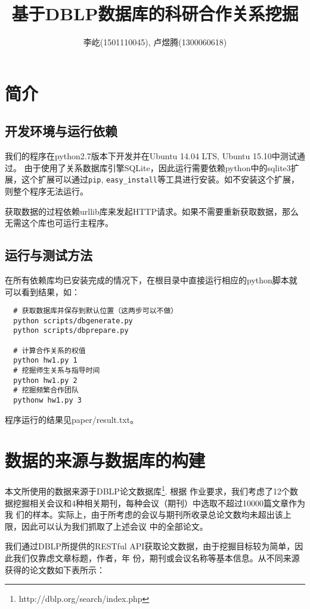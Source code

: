 \documentclass[a4paper]{article}
\title{基于DBLP数据库的科研合作关系挖掘}
\author{李屹(1501110045), 卢煜腾(1300060618)}
\begin{document}
\maketitle

\section{简介} 
\subsection{开发环境与运行依赖}
我们的程序在python2.7版本下开发并在Ubuntu 14.04 LTS, Ubuntu 15.10中测试通过。
由于使用了关系数据库引擎SQLite，因此运行需要依赖python中的sqlite3扩展，这个扩展可以通过\texttt{pip},
\texttt{easy\_install}等工具进行安装。如不安装这个扩展，则整个程序无法运行。

获取数据的过程依赖urllib库来发起HTTP请求。如果不需要重新获取数据，那么无需这个库也可运行主程序。

\subsection{运行与测试方法}
在所有依赖库均已安装完成的情况下，在根目录中直接运行相应的python脚本就可以看到结果，如：
\begin{verbatim}
  # 获取数据库并保存到默认位置（这两步可以不做）
  python scripts/dbgenerate.py
  python scripts/dbprepare.py

  # 计算合作关系的权值
  python hw1.py 1
  # 挖掘师生关系与指导时间
  python hw1.py 2
  # 挖掘频繁合作团队
  pythonw hw1.py 3
\end{verbatim}
程序运行的结果见paper/result.txt。

\section{数据的来源与数据库的构建}
本文所使用的数据来源于DBLP论文数据库\footnote{http://dblp.org/search/index.php}. 根据
作业要求，我们考虑了12个数据挖掘相关会议和4种相关期刊，每种会议（期刊）中选取不超过10000篇文章作为我
们的样本。实际上，由于所考虑的会议与期刊所收录总论文数均未超出该上限，因此可以认为我们抓取了上述会议
中的全部论文。

我们通过DBLP所提供的RESTful API获取论文数据，由于挖掘目标较为简单，因此我们仅靠虑文章标题，作者，年
份，期刊或会议名称等基本信息。从不同来源获得的论文数如下表所示：
\end{document}
